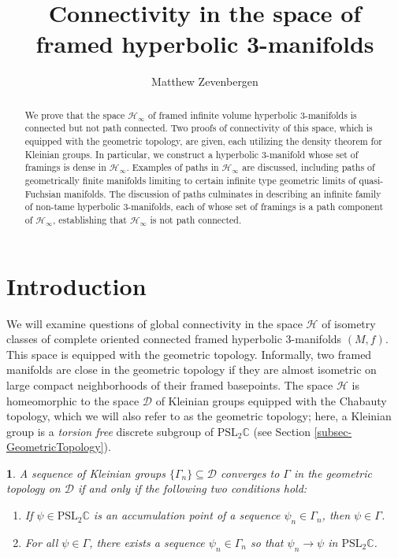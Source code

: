 \documentclass[11pt,leqno]{article}
\title{Connectivity in the space of framed hyperbolic 3-manifolds}
\author{Matthew Zevenbergen}
\date{}
\theoremstyle{introdef}
\newtheorem*{empty*}{}
\numberwithin{lemma}{section}
\theoremstyle{definition}
\newcommand{\C}{\mathbb{C}}
\begin{document}
\maketitle

\begin{abstract}
    We prove that the space $\mathcal{H}_\infty$ of framed infinite volume hyperbolic $3$-manifolds is connected but not path connected. Two proofs of connectivity of this space, which is equipped with the geometric topology, are given, each utilizing the density theorem  for Kleinian groups. In particular, we construct a hyperbolic $3$-manifold whose set of framings is dense in $\mathcal{H}_\infty$. Examples of paths in $\mathcal{H}_\infty$ are discussed, including paths of geometrically finite manifolds limiting to certain infinite type geometric limits of quasi-Fuchsian manifolds. The discussion of paths culminates in describing an infinite family of non-tame hyperbolic $3$-manifolds, each of whose set of framings is a path component of $\mathcal{H}_\infty$, establishing that $\mathcal{H}_\infty$ is not path connected.
\end{abstract}


\section{Introduction}

We will examine questions of global connectivity in the space $\mathcal{H}$ of isometry classes of complete oriented connected framed hyperbolic $3$-manifolds $(M,f)$. This space is equipped with the geometric topology. Informally, two framed manifolds are close in the geometric topology if they are almost isometric on large compact neighborhoods of their framed basepoints. The space $\mathcal{H}$ is homeomorphic to the space $\mathcal{D}$ of Kleinian groups equipped with the Chabauty topology, which we will also refer to as the geometric topology; here, a Kleinian group is a\textit{ torsion free }discrete subgroup of $\mathrm{PSL}_2\C$ (see Section \ref{subsec-GeometricTopology}). 

\begin{empty*}
    A sequence of Kleinian groups $\{\Gamma_n\}\subseteq\mathcal{D}$ converges to $\Gamma$ in the geometric topology on $\mathcal{D}$ if and only if the following two conditions hold:
    \begin{enumerate}
        \item If $\psi\in\mathrm{PSL}_2\C$ is an accumulation point of a sequence $\psi_n\in\Gamma_n$, then $\psi\in\Gamma$.
        \item For all $\psi\in\Gamma$, there exists a sequence $\psi_n\in\Gamma_n$ so that $\psi_n\rightarrow\psi$ in $\mathrm{PSL}_2\C$.
    \end{enumerate}
\end{empty*}
\end{document}
